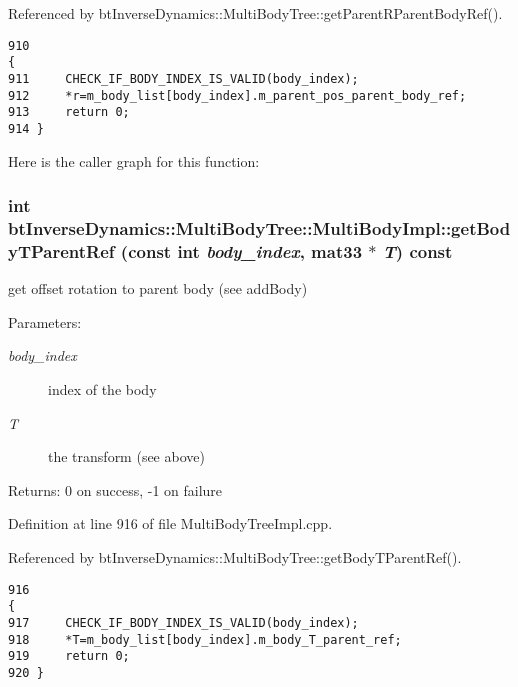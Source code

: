 Referenced by btInverseDynamics::MultiBodyTree::getParentRParentBodyRef().

\begin{Code}\begin{verbatim}910                                                                                            {
911     CHECK_IF_BODY_INDEX_IS_VALID(body_index);
912     *r=m_body_list[body_index].m_parent_pos_parent_body_ref;
913     return 0;
914 }
\end{verbatim}
\end{Code}




Here is the caller graph for this function:\hypertarget{classbt_inverse_dynamics_1_1_multi_body_tree_1_1_multi_body_impl_e42c54a737ebba57e2d0e30f4cce7af4}{
\subsubsection[getBodyTParentRef]{\setlength{\rightskip}{0pt plus 5cm}int btInverseDynamics::MultiBodyTree::MultiBodyImpl::getBodyTParentRef (const int {\em body\_\-index}, \/  mat33 $\ast$ {\em T}) const}}
\label{classbt_inverse_dynamics_1_1_multi_body_tree_1_1_multi_body_impl_e42c54a737ebba57e2d0e30f4cce7af4}


get offset rotation to parent body (see addBody) \begin{Desc}
\item[Parameters:]
\begin{description}
\item[{\em body\_\-index}]index of the body \item[{\em T}]the transform (see above) \end{description}
\end{Desc}
\begin{Desc}
\item[Returns:]0 on success, -1 on failure \end{Desc}
 

Definition at line 916 of file MultiBodyTreeImpl.cpp.

Referenced by btInverseDynamics::MultiBodyTree::getBodyTParentRef().

\begin{Code}\begin{verbatim}916                                                                                       {
917     CHECK_IF_BODY_INDEX_IS_VALID(body_index);
918     *T=m_body_list[body_index].m_body_T_parent_ref;
919     return 0;
920 }
\end{verbatim}
\end{Code}




